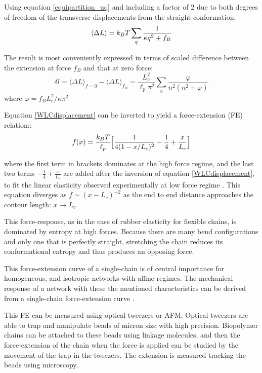 Using equation \ref{equipartition_uq} and including a factor of $2$ due to both
degrees of freedom of the transverse displacements from the straight
conformation:
\begin{equation}\label{deltaLmean}
\langle\Delta L\rangle = k_B{}T\sum_q \frac{1}{\kappa{}q^2+f_B}
\end{equation}

The result is most conveniently expressed in terms of scaled difference between
the extension at force $f_B$ and that at zero force\citep{storm_nonlinear_2005}:
\begin{equation}\label{WLCdisplacement}
\delta l=\langle\Delta L\rangle_{f=0} - \langle\Delta L\rangle_{f_B} =
\frac{L_c^2}{\ell_p\pi^2} \sum_q \frac{\varphi}{n^2(n^2 + \varphi)}
\end{equation} 
where $\varphi = f_BL_c^2/\kappa{}\pi^2$

Equation \ref{WLCdisplacement} can be inverted to yield a force-extension (FE)
relation:\citep{marko_stretching_1995}:
\begin{equation}\label{FEMarko}
f(x)=\frac{k_B{}T}{\ell_p} \Big[ \frac{1}{4(1 - x/L_c)^2} 
-\frac{1}{4}+\frac{x}{L_c} \Big]
\end{equation}

where the first term in brackets dominates at the
high force regime, and the last two terms $-\frac{1}{4}+\frac{x}{L_c}$ are added
after the inversion of equation \ref{WLCdisplacement}, to fit the linear
elasticity observed experimentally at low force regime
\citep{marko_stretching_1995}.
This equation diverges as $f \sim (x - L_c)^{-2}$ as the end to end
distance approaches the contour length: $x\rightarrow L_c$.

This force-response, as in the case of rubber elasticity  for flexible
chains, is dominated by entropy at high forces. Because there are many
bend configurations and only one that is perfectly straight, stretching the
chain reduces its conformational entropy and thus produces an opposing
force.

This force-extension curve of a single-chain is of central importance for homogeneous,
and isotropic networks with affine regimes. The mechanical response of a network with these the mentioned characteristics can be derived from a single-chain force-extension curve \cite{storm_nonlinear_2005}.

This FE can be measured using optical tweezers or \gls{AFM}.
Optical tweezers are able to trap and manipulate beads of
micron size with high
precision\citep{svoboda_biological_1994,svoboda_direct_1993}.
Biopolymer chains can be attached to these beads using linkage molecules, and then the force-extension of the
chain when the force is applied can be studied by the movement of the trap in
the tweezers.
The extension is measured tracking the beads using microscopy.

